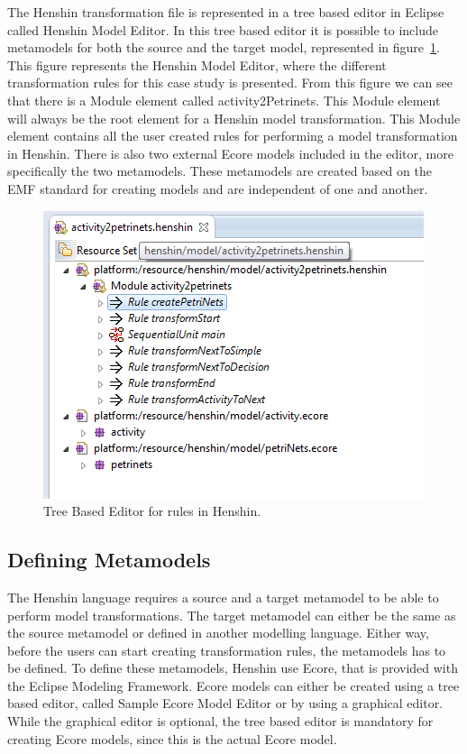\documentclass[pdftex,11pt,a4paper]{article}
\begin{document}
The Henshin transformation file is represented in a tree based editor in
Eclipse called Henshin Model Editor. In this tree based editor it is possible
to include metamodels for both the source and the target model, represented in
figure~\ref{fig:Henshin_TreeEditor}. This figure represents the Henshin
Model Editor, where the different transformation rules for this case study is
presented. From this figure we can see that there is a Module element called
activity2Petrinets. This Module element will always be the root element for a
Henshin model transformation. This Module element contains all the user created
rules for performing a model transformation in Henshin. There is also two
external Ecore models included in the editor, more specifically the two
metamodels. These metamodels are created based on the EMF standard for creating
models and are independent of one and another.

\begin{figure}[H]
	\centering
	\includegraphics[scale=0.7]{figures/Henshin_TreeEdtiro.png}
	\caption{Tree Based Editor for rules in Henshin.}
	\label{fig:Henshin_TreeEditor}
\end{figure}

\subsection{Defining Metamodels}

The Henshin language requires a source and a target metamodel to be able to
perform model transformations. The target metamodel can either be the same as
the source metamodel or defined in another modelling language. Either way, before
the users can start creating transformation rules, the metamodels has
to be defined. To define these metamodels, Henshin use Ecore, that is
provided with the Eclipse Modeling Framework\cite{Steinberg2009}. Ecore models
can either be created using a tree based editor, called Sample Ecore Model
Editor or by using a graphical editor. While the graphical editor is optional,
the tree based editor is mandatory for creating Ecore models, since this is the
actual Ecore model. 
\end{document}
